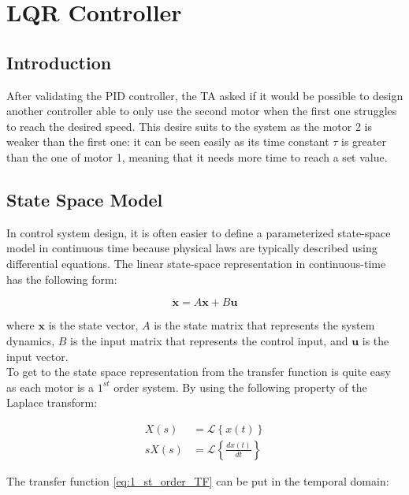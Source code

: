 \chapter{LQR Controller}
\label{section:lqr}

\section{Introduction}
\label{section:lqr introduction}

After validating the PID controller, the TA asked if it would be possible to design another controller able to only use
the second motor when the first one struggles to reach the desired speed. This desire suits to the system as the motor 2
is weaker than the first one: it can be seen easily as its time constant $\tau$ is greater than the one of motor 1, 
meaning that it needs more time to reach a set value.

\section{State Space Model}
\label{section:ss representation}
In control system design, it is often easier to define a parameterized state-space model in continuous time because 
physical laws are typically described using differential equations. The linear state-space representation in 
continuous-time has the following form:

\begin{equation}
    \dot{\mathbf{x}} = A \mathbf{x} + B \mathbf{u}
    \label{eq:state_space_models}
\end{equation}

where \( \mathbf{x} \) is the state vector, \( A \) is the state matrix that represents the system dynamics, 
\( B \) is the input matrix that represents the control input, and \( \mathbf{u} \) is the input vector.\\
To get to the state space representation from the transfer function is quite easy as each motor is a $1^{st}$ order
system. By using the following property of the Laplace transform:

\begin{align}
    X(s) &= \mathcal{L}\left\{x(t)\right\}\\
    s X(s) &= \mathcal{L}\left\{\frac{d x(t)}{dt}\right\}
\end{align}

The transfer function \ref{eq:1_st_order_TF} can be put in the temporal domain:

